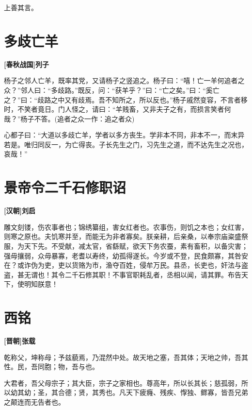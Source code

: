 \documentclass[UTF8,titlepage,oneside]{ctexbook}
\begin{document}
上善其言。


\chapter*{多歧亡羊}
\begin{center}
	\textbf{[春秋战国]列子}
\end{center}

杨子之邻人亡羊，既率其党，又请杨子之竖追之。杨子曰：“嘻！亡一羊何追者之众？”邻人曰：“多歧路。”既反，问：“获羊乎？”曰：“亡之矣。”曰：“奚亡之？”曰：“歧路之中又有歧焉。吾不知所之，所以反也。”杨子戚然变容，不言者移时，不笑者竟日。门人怪之，请曰：“羊贱畜，又非夫子之有，而损言笑者何哉？”杨子不答。(追者之众一作：追之者众)

心都子曰：“大道以多歧亡羊，学者以多方丧生。学非本不同，非本不一，而末异若是。唯归同反一，为亡得丧。子长先生之门，习先生之道，而不达先生之况也，哀哉！”


\chapter*{景帝令二千石修职诏}
\begin{center}
	\textbf{[汉朝]刘启}
\end{center}


雕文刻镂，伤农事者也；锦绣纂组，害女红者也。农事伤，则饥之本也；女红害，则寒之原也。夫饥寒并至，而能无为非者寡矣。朕亲耕，后亲桑，以奉宗庙粢盛祭服，为天下先。不受献，减太官，省繇赋，欲天下务农蚕，素有畜积，以备灾害；强毋攘弱，众毋暴寡，老耆以寿终，幼孤得遂长。今岁或不登，民食颇寡，其咎安在？或诈伪为吏，吏以货赂为市，渔夺百姓，侵牟万民。县丞，长吏也，奸法与盗盗，甚无谓也！其令二千石修其职！不事官职耗乱者，丞相以闻，请其罪。布告天下，使明知朕意！

\chapter*{西铭}
\begin{center}
	\textbf{[晋朝]张载}
\end{center}


乾称父，坤称母；予兹藐焉，乃混然中处。故天地之塞，吾其体；天地之帅，吾其性。民，吾同胞；物，吾与也。


大君者，吾父母宗子；其大臣，宗子之家相也。尊高年，所以长其长；慈孤弱，所以幼其幼；圣，其合德；贤，其秀也。凡天下疲癃、残疾、惸独、鳏寡，皆吾兄弟之颠连而无告者也。
\end{document}
